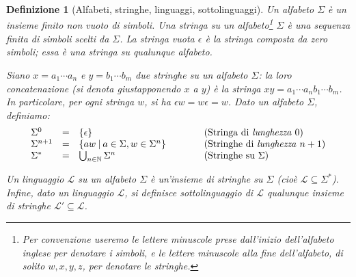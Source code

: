 \documentclass[12pt,a4paper,openright,twoside]{report}
\newtheorem{dfn}[thm]{Definizione}
\begin{document}
\begin{dfn}[Alfabeti, stringhe, linguaggi, sottolinguaggi]
Un \emph{alfabeto} $\Sigma$ \`e un insieme finito non vuoto di \emph{simboli}. Una \emph{stringa su un alfabeto}\footnote{Per convenzione useremo le lettere minuscole prese dall'inizio dell'alfabeto inglese per denotare i simboli, e le lettere minuscole alla fine dell'alfabeto, di solito $w, x, y, z$, per denotare le stringhe.} $\Sigma$ \`e una sequenza finita di simboli scelti da $\Sigma$. La \emph{stringa vuota} $\epsilon$ \`e la stringa composta da zero simboli; essa \`e una stringa su qualunque alfabeto.

Siano $x = a_1 \cdots a_n$ e $y = b_1 \cdots b_m$ due stringhe su un alfabeto $\Sigma$: la loro \emph{concatenazione} (si denota giustapponendo $x$ a $y$) \`e la stringa $xy = a_1 \cdots a_n b_1 \cdots b_m$. In particolare, per ogni stringa $w$, si ha $\epsilon w = w \epsilon = w$. Dato un alfabeto $\Sigma$, definiamo:
$$
\begin{array}{lclll}
	\Sigma^0 & = & \{\epsilon\} & \qquad & \mbox{(Stringa di \emph{lunghezza} $0$)} \\
	\Sigma^{n+1} & = & \{ a w \:|\: a \in \Sigma, w \in \Sigma^n\} & \qquad & \mbox{(Stringhe di \emph{lunghezza} $n+1$)} \\
	\Sigma^* & = & \bigcup_{n \in \mathbb{N}} \Sigma^n & \qquad & \mbox{(Stringhe su $\Sigma$)}
\end{array}
$$

Un \emph{linguaggio} $\mathscr{L}$ \emph{su un alfabeto} $\Sigma$ \`e un'insieme di stringhe su $\Sigma$ (cio\`e $\mathscr{L} \subseteq \Sigma^*$). Infine, dato un linguaggio $\mathscr{L}$, si definisce \emph{sottolinguaggio di} $\mathscr{L}$ qualunque insieme di stringhe $\mathscr{L}' \subseteq \mathscr{L}$.
\end{dfn}
\end{document}
